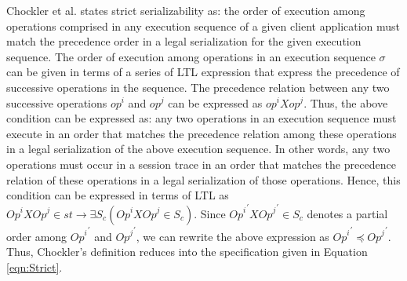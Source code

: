 \documentclass{sig-alternate-05-2015}
\begin{document}
 \par Chockler et al. states strict serializability as: the order of execution among operations comprised in any execution
 sequence of a given client application must match the precedence order in a legal serialization for the given
 execution sequence. The order  of execution among operations in an execution sequence $\sigma$
 can be given  in terms of a series of LTL expression that express the precedence of successive operations in the sequence.
  The precedence relation between any two successive operations $\mathit{op}^i$ and $\mathit{op}^j$ can be expressed as
   $\mathit{op}^i X \mathit{op}^j$.  Thus, the above condition can be expressed as: any two operations in an execution
   sequence must execute in an order that matches the precedence relation among these operations in a legal
   serialization of the above execution sequence. In other words, any two operations must occur in a session trace in an
   order that matches the precedence relation of these operations in a legal serialization of those operations.  Hence, this condition can be expressed in terms of LTL as
   $\mathit{Op}^i X \mathit{Op}^j \in \mathit{st}
\rightarrow \exists S_c \left( \mathit{Op}^i X \mathit{Op}^j \in S_c \right)$. Since ${\mathit{Op}^i}^{'}  X {\mathit{Op}^j}^{'}  \in S_c$ denotes a partial order among ${\mathit{Op}^i}^{'} $ and ${\mathit{Op}^j}^{'}$, we can rewrite the above expression as  ${\mathit{Op}^i}^{'}  \preccurlyeq {\mathit{Op}^j}^{'} $. Thus, Chockler's definition reduces into the specification given in Equation \ref{eqn:Strict}. 
\end{document}
